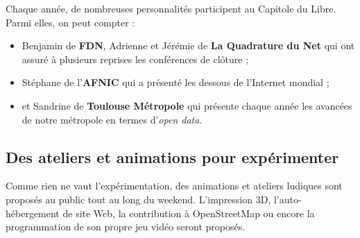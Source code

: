 Chaque année, de nombreuses personnalités participent au Capitole du Libre. Parmi elles, on peut compter :

\begin{itemize}[label=$\bullet$]
\item Benjamin  de \textbf{FDN}, Adrienne  et Jérémie  de \textbf{La Quadrature du Net} qui ont assuré à plusieurs reprises les conférences de clôture ;
\item Stéphane  de l'\textbf{AFNIC} qui a présenté les dessous de l'Internet mondial ;
\item et Sandrine  de \textbf{Toulouse Métropole} qui présente chaque année les avancées de notre métropole en termes d'\textit{open data}.
\end{itemize} 

\subsection{Des ateliers et animations pour expérimenter}

\begin{minipage}{0.6\textwidth}

Comme rien ne vaut l'expérimentation, des animations et ateliers ludiques sont proposés au public tout au long du weekend. L’impression 3D, l’auto-hébergement de site Web, la contribution à OpenStreetMap ou encore la programmation de son propre jeu vidéo seront proposés.

\end{minipage}
\begin{minipage}{0.4\textwidth}
\begin{center}
\end{center}
\end{minipage}

